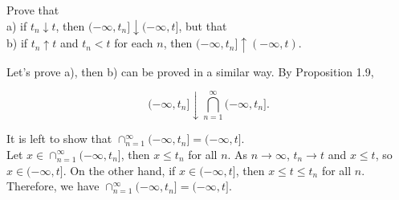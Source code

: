 \begin{exercise}
Prove that \\
a) if $t_n\downarrow t$, then $(-\infty, t_n]\downarrow (-\infty, t]$, but that \\
b) if $t_n\uparrow t$ and $t_n < t$ for each $n$, then $(-\infty, t_n]\uparrow (-\infty, t)$.
\end{exercise}
\begin{solution}
Let's prove a), then b) can be proved in a similar way. By Proposition 1.9,

\[(-\infty, t_n] \downarrow \bigcap_{n=1}^\infty (-\infty, t_n] .\]

It is left to show that $\cap_{n=1}^\infty(-\infty, t_n] = (-\infty, t]$. \\

Let $x\in\cap_{n=1}^\infty(-\infty, t_n]$, then $x\leq t_n$ for all $n$. As $n\to\infty$, $t_n\to t$ and $x \leq t$, so $x\in (-\infty, t]$. On the other hand, if $x\in(-\infty, t]$, then $x\leq t\leq t_n$ for all $n$. Therefore, we have $\cap_{n=1}^\infty(-\infty, t_n] = (-\infty, t]$.
\end{solution}